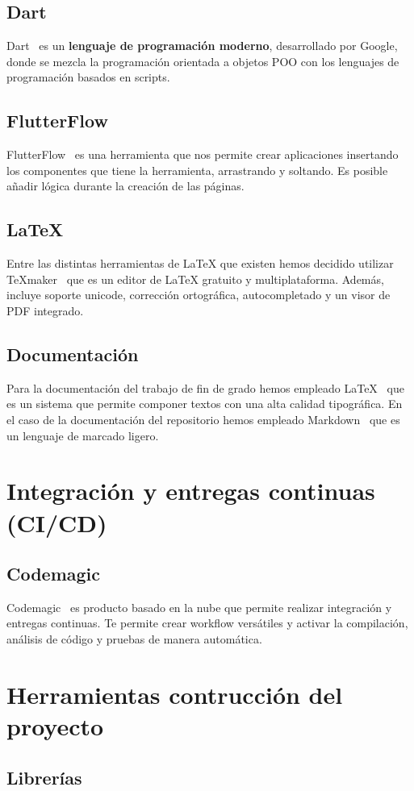 \subsection{Dart}
Dart~\cite{dart} es un \textbf{lenguaje de programación moderno}, desarrollado por Google, donde se mezcla la programación orientada a objetos POO con los lenguajes de programación basados en scripts.
\subsection{FlutterFlow}
FlutterFlow~\cite{flutterflow} es una herramienta que nos permite crear aplicaciones insertando los componentes que tiene la herramienta, arrastrando y soltando. Es posible añadir lógica durante la creación de las páginas.
\subsection{LaTeX}
Entre las distintas herramientas de \LaTeX{} que existen hemos decidido utilizar TeXmaker~\cite{wiki:texmaker, texmaker} que es un editor de \LaTeX{} gratuito y multiplataforma. Además, incluye soporte unicode, corrección ortográfica, autocompletado y un visor de PDF integrado.
\subsection{Documentación}
Para la documentación del trabajo de fin de grado hemos empleado \LaTeX{}~\cite{wiki:latex} que es un sistema que permite componer textos con una alta calidad tipográfica. En el caso de la documentación del repositorio hemos empleado Markdown~\cite{wiki:markdown} que es un lenguaje de marcado ligero.
\section{Integración y entregas continuas (CI/CD)}
\subsection{Codemagic}
Codemagic~\cite{codemagic} es producto basado en la nube que permite realizar integración y entregas continuas. Te permite crear workflow versátiles y activar la compilación,  análisis de código y pruebas de manera automática.
\section{Herramientas contrucción del proyecto}
\subsection{Librerías}



